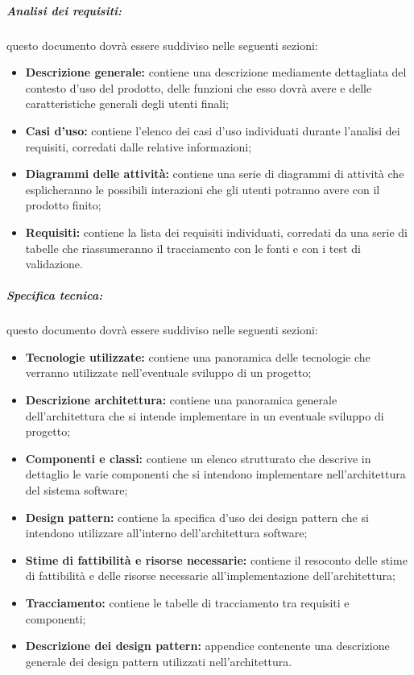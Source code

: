 \subparagraph{Analisi dei requisiti:} questo documento dovrà essere suddiviso nelle seguenti sezioni:
\begin{itemize}
\item \textbf{Descrizione generale:} contiene una descrizione mediamente dettagliata del contesto d'uso del prodotto, delle funzioni che esso dovrà avere e delle caratteristiche generali degli utenti finali;
\item \textbf{Casi d'uso:} contiene l'elenco dei casi d'uso individuati durante l'analisi dei requisiti, corredati dalle relative informazioni;
\item \textbf{Diagrammi delle attività:} contiene una serie di diagrammi di attività che esplicheranno le possibili interazioni che gli utenti potranno avere con il prodotto finito;
\item \textbf{Requisiti:} contiene la lista dei requisiti individuati, corredati da una serie di tabelle che riassumeranno il tracciamento con le fonti e con i test di validazione.
\end{itemize}

\subparagraph{Specifica tecnica:}
\label{parspecificatecnica}
 questo documento dovrà essere suddiviso nelle seguenti sezioni:
\begin{itemize}
\item \textbf{Tecnologie utilizzate:} contiene una panoramica delle tecnologie che verranno utilizzate nell'eventuale sviluppo di un progetto;
\item \textbf{Descrizione architettura:} contiene una panoramica generale dell'architettura che si intende implementare in un eventuale sviluppo di progetto;
\item \textbf{Componenti e classi:} contiene un elenco strutturato che descrive in dettaglio le varie componenti che si intendono implementare nell'architettura del sistema software;
\item \textbf{Design pattern:} contiene la specifica d'uso dei design pattern\g{} che si intendono utilizzare all'interno dell'architettura software;
\item \textbf{Stime di fattibilità e risorse necessarie:} contiene il resoconto delle stime di fattibilità e delle risorse necessarie all'implementazione dell'architettura;
\item \textbf{Tracciamento:} contiene le tabelle di tracciamento tra requisiti e componenti;
\item \textbf{Descrizione dei design pattern:}  appendice contenente una descrizione generale dei design pattern\g{} utilizzati nell'architettura.
\end{itemize}

